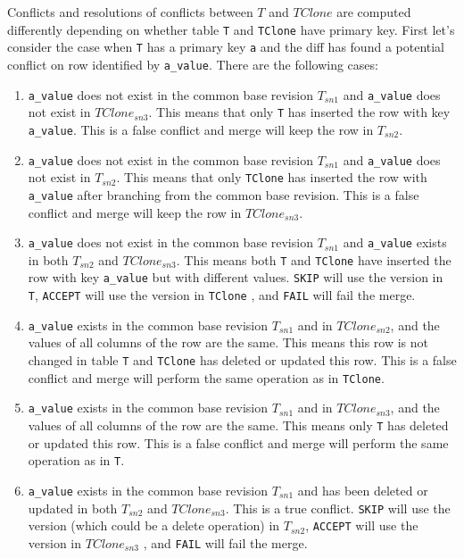 \documentclass[sigconf,nonacm]{acmart} %
\begin{document}
Conflicts and resolutions of conflicts between $T$ and $TClone$
are computed differently depending on whether table \texttt{T} and \texttt{TClone} 
have primary key.
First let's consider the case when \texttt{T} has a primary key \texttt{a} and the diff has
found a potential conflict on row identified by \texttt{a\_value}.  
There are the following cases:

\begin{enumerate}
\item \texttt{a\_value} does not exist in the common base revision $T_{sn1}$ 
and \texttt{a\_value} does not exist in $TClone_{sn3}$.
This means that only \texttt{T} has inserted the row with key \texttt{a\_value}.
This is a false conflict and merge will keep the row in $T_{sn2}$.

\item \texttt{a\_value} does not exist in the common base revision $T_{sn1}$
and \texttt{a\_value} does not exist in $T_{sn2}$.
This means that only \texttt{TClone} has inserted the row with 
\texttt{a\_value} after branching from the common base revision.  
This is a false conflict and 
merge will keep the row in $TClone_{sn3}$.

\item \texttt{a\_value} does not exist in the common base revision 
$T_{sn1}$ and 
\texttt{a\_value} exists in both $T_{sn2}$ and $TClone_{sn3}$.
This means both \texttt{T} and \texttt{TClone} have inserted the row 
with key \texttt{a\_value} but with different values.  
\texttt{SKIP} will use the version in \texttt{T}, 
\texttt{ACCEPT} will use the version in \texttt{TClone}
, and \texttt{FAIL} will fail the merge.

\item \texttt{a\_value} exists in the common base revision $T_{sn1}$ 
and in $TClone_{sn2}$, and the values of all columns of the row 
are the same.  This means this row is not changed in table 
\texttt{T} and \texttt{TClone} has deleted or updated 
this row.  This is a false conflict and merge will perform the 
same operation as in \texttt{TClone}.

\item \texttt{a\_value} exists in the common base revision $T_{sn1}$ 
and in $TClone_{sn3}$, and the values of all columns of the row 
are the same. This means only \texttt{T} has deleted or updated 
this row.  This is a false conflict and merge will perform the 
same operation as in \texttt{T}.

\item \texttt{a\_value} exists in the common base revision $T_{sn1}$
and has been deleted or updated in both $T_{sn2}$ and $TClone_{sn3}$.  
This is a true conflict.
\texttt{SKIP} will use the version (which could be a delete operation) 
in $T_{sn2}$, \texttt{ACCEPT} will use the version in $TClone_{sn3}$
, and \texttt{FAIL} will fail the merge.
\end{enumerate}
\end{document}
